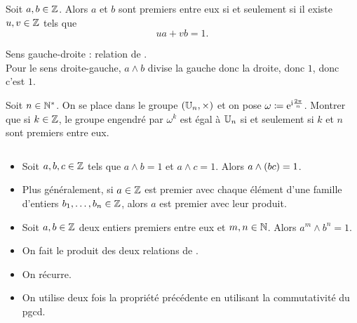 \documentclass{magnolia}
\begin{document}
\begin{proposition}
Soit $a,b\in\mathbb{Z}$. Alors $a$ et $b$ sont premiers entre eux si et seulement si il
existe $u,v\in\mathbb{Z}$ tels que
\[ua+vb=1.\]
\end{proposition}

\begin{preuve}
Sens gauche-droite : relation de .\\
Pour le sens droite-gauche, $a\wedge b$ divise la gauche donc la droite, donc $1$, donc c'est $1$.
\end{preuve}

\begin{exoUnique}
  \exo Soit $n\in{\mathbb{N}^*}$. On se place dans le groupe $(\U[n],\times)$ et on pose $\omega\coloneqq{\rm e}^{{\rm i}\frac{2\pi}{n}}$. Montrer que si $k\in\mathbb{Z}$, le groupe engendré par
    $\omega^k$ est égal à $\U[n]$ si et seulement si $k$ et $n$ sont premiers
    entre eux.
  \end{exoUnique}
  
\begin{proposition}
$\quad$
\begin{itemize}
\item Soit $a,b,c\in\mathbb{Z}$ tels que $a\wedge b=1$ et $a\wedge c=1$. Alors
  $a\wedge \left(bc\right)=1$.
\item Plus généralement, si $a\in\mathbb{Z}$ est premier avec chaque élément d'une
  famille d'entiers $b_1,\ldots,b_n\in\mathbb{Z}$, alors $a$ est premier avec leur
  produit.
\item Soit $a,b\in\mathbb{Z}$ deux entiers premiers entre eux et $m,n\in\mathbb{N}$. Alors
  $a^m\wedge b^n=1$.
\end{itemize}
\end{proposition}

\begin{preuve}
\begin{itemize}
\item On fait le produit des deux relations de .
\item On récurre.
\item On utilise deux fois la propriété précédente en utilisant la commutativité du pgcd.
\end{itemize}
\end{preuve}
\end{document}

